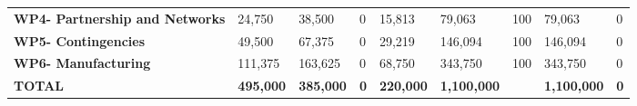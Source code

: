 \begin{table}[H]
{\begin{tabular}{p{5cm}p{2cm}p{2cm}p{2.5cm}p{2cm}p{2cm}p{2cm}p{2cm}p{2cm}}
\textbf{WP4- Partnership and Networks} & 24,750                                                                 & 38,500                                                             & 0                                                                               & 15,813                                                                       & 79,063                                                                                        & 100                          & 79,063                          & 0                                                                         \\
\textbf{WP5- Contingencies}                                                        & 49,500                                                                 & 67,375                                                             & 0                                                                               & 29,219                                                                       & 146,094                                                                                       & 100                          & 146,094                         & 0                                                                         \\
\textbf{WP6- Manufacturing}                                                        & 111,375                                                                & 163,625                                                            & 0                                                                               & 68,750                                                                       & 343,750                                                                                       & 100                          & 343,750                         & 0                                                                         \\ \hline
\textbf{TOTAL}                                                                     & \textbf{495,000}                                                       & \textbf{385,000}                                                   & \textbf{0}                                                                      & \textbf{220,000}                                                             & \textbf{1,100,000}                                                                            & \textbf{}                    & \textbf{1,100,000}              & \textbf{0}                                                               
\\ \bottomrule[2pt]
\end{tabular} }
\end{table}

